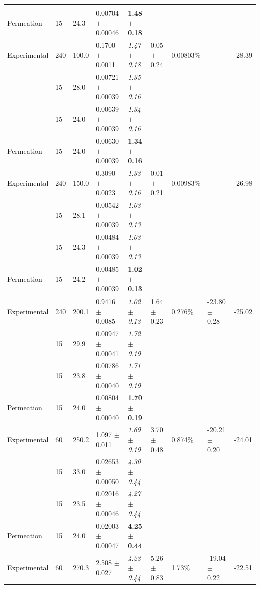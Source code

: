 \begin{chplandscape}
\begin{small}
\begin{longtable}{p{1.9cm}p{0.9cm}p{1.0cm}p{2.7cm}p{1.8cm}p{1.7cm}p{1.5cm}p{2.1cm}p{1.4cm}}
\middlehline
\endhead
\middlehline
\multicolumn{9}{r}{\textit{continued on next page}} \\
\endfoot
\bottomhline
\endlastfoot
Permeation & 15 & 24.3 & 0.00704 $\pm$ 0.00046 & \textbf{1.48 $\pm$ 0.18} &  &  &  &  \\
Experimental & 240 & 100.0 & 0.1700 $\pm$ 0.0011 & \textit{1.47 $\pm$ 0.18} & 0.05 $\pm$ 0.24 & 0.00803\% & -- & -28.39 \\
 & 15 & 28.0 & 0.00721 $\pm$ 0.00039 & \textit{1.35 $\pm$ 0.16} &  &  &  &  \\
 & 15 & 24.0 & 0.00639 $\pm$ 0.00039 & \textit{1.34 $\pm$ 0.16} &  &  &  &  \\
Permeation & 15 & 24.0 & 0.00630 $\pm$ 0.00039 & \textbf{1.34 $\pm$ 0.16} &  &  &  &  \\
Experimental & 240 & 150.0 & 0.3090 $\pm$ 0.0023 & \textit{1.33 $\pm$ 0.16} & 0.01 $\pm$ 0.21 & 0.00983\% & -- & -26.98 \\
 & 15 & 28.1 & 0.00542 $\pm$ 0.00039 & \textit{1.03 $\pm$ 0.13} &  &  &  &  \\
 & 15 & 24.3 & 0.00484 $\pm$ 0.00039 & \textit{1.03 $\pm$ 0.13} &  &  &  &  \\
Permeation & 15 & 24.2 & 0.00485 $\pm$ 0.00039 & \textbf{1.02 $\pm$ 0.13} &  &  &  &  \\
Experimental & 240 & 200.1 & 0.9416 $\pm$ 0.0085 & \textit{1.02 $\pm$ 0.13} & 1.64 $\pm$ 0.23 & 0.276\% & -23.80 $\pm$ 0.28 & -25.02 \\
 & 15 & 29.9 & 0.00947 $\pm$ 0.00041 & \textit{1.72 $\pm$ 0.19} &  &  &  &  \\
 & 15 & 23.8 & 0.00786 $\pm$ 0.00040 & \textit{1.71 $\pm$ 0.19} &  &  &  &  \\
Permeation & 15 & 24.0 & 0.00804 $\pm$ 0.00040 & \textbf{1.70 $\pm$ 0.19} &  &  &  &  \\
Experimental & 60 & 250.2 & 1.097 $\pm$ 0.011 & \textit{1.69 $\pm$ 0.19} & 3.70 $\pm$ 0.48 & 0.874\% & -20.21 $\pm$ 0.20 & -24.01 \\
 & 15 & 33.0 & 0.02653 $\pm$ 0.00050 & \textit{4.30 $\pm$ 0.44} &  &  &  &  \\
 & 15 & 23.5 & 0.02016 $\pm$ 0.00046 & \textit{4.27 $\pm$ 0.44} &  &  &  &  \\
Permeation & 15 & 24.0 & 0.02003 $\pm$ 0.00047 & \textbf{4.25 $\pm$ 0.44} &  &  &  &  \\
Experimental & 60 & 270.3 & 2.508 $\pm$ 0.027 & \textit{4.23 $\pm$ 0.44} & 5.26 $\pm$ 0.83 & 1.73\% & -19.04 $\pm$ 0.22 & -22.51 \\

\end{longtable}
\end{small}
\end{chplandscape}
